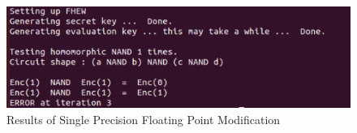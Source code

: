 \begin{figure}[!h]
\centering
\includegraphics[scale=0.65]{figures/spresults.png}
\caption{Results of Single Precision Floating Point Modification}
\label{fig:SPresults}
\end{figure}